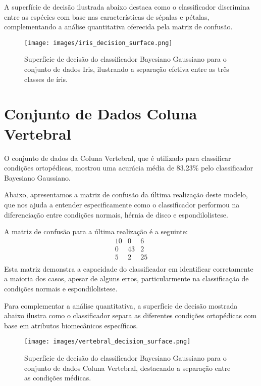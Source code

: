 \documentclass[12pt, a4paper]{report}
\begin{document}
A superfície de decisão ilustrada abaixo destaca como o classificador discrimina entre as espécies com base nas características de sépalas e pétalas, complementando a análise quantitativa oferecida pela matriz de confusão.

\begin{figure}[H]
\centering
\texttt{[image: images/iris\_decision\_surface.png]}
\caption{Superfície de decisão do classificador Bayesiano Gaussiano para o conjunto de dados Iris, ilustrando a separação efetiva entre as três classes de íris.}
\label{fig:iris_decision_surface}
\end{figure}

\section{Conjunto de Dados Coluna Vertebral}

O conjunto de dados da Coluna Vertebral, que é utilizado para classificar condições ortopédicas, mostrou uma acurácia média de 83.23\% pelo classificador Bayesiano Gaussiano. 

Abaixo, apresentamos a matriz de confusão da última realização deste modelo, que nos ajuda a entender especificamente como o classificador performou na diferenciação entre condições normais, hérnia de disco e espondilolistese.

A matriz de confusão para a última realização é a seguinte:
\[
\begin{array}{ccc}
10 & 0 & 6 \\
0 & 43 & 2 \\
5 & 2 & 25 \\
\end{array}
\]
Esta matriz demonstra a capacidade do classificador em identificar corretamente a maioria dos casos, apesar de alguns erros, particularmente na classificação de condições normais e espondilolistese.

Para complementar a análise quantitativa, a superfície de decisão mostrada abaixo ilustra como o classificador separa as diferentes condições ortopédicas com base em atributos biomecânicos específicos.

\begin{figure}[H]
\centering
\texttt{[image: images/vertebral\_decision\_surface.png]}
\caption{Superfície de decisão do classificador Bayesiano Gaussiano para o conjunto de dados Coluna Vertebral, destacando a separação entre as condições médicas.}
\label{fig:spine_decision_surface}
\end{figure}
\end{document}
